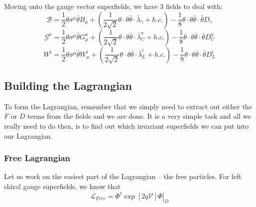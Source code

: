   Moving onto the gauge vector superfields, we have 3 fields to deal with:
  \begin{equation}
    \mathcal{B} = \frac{1}{2} \theta \sigma^\mu \bar{\theta} B_\mu + \left(\frac{1}{2\sqrt{2}} \theta\cdot\theta \bar{\theta}\cdot\bar{\lambda}_\gamma + h.c. \right) - \frac{1}{8}\theta\cdot\theta \bar{\theta}\cdot\bar{\theta} D_\gamma
  \end{equation}
  \begin{equation}
    \mathcal{G}^a = \frac{1}{2} \theta\sigma^\mu \bar{\theta} G^a_\mu + \left(\frac{1}{2\sqrt{2}} \theta\cdot\theta \bar{\theta}\cdot\bar{\lambda}^a_C + h.c.\right) - \frac{1}{8}\theta\cdot\theta\bar{\theta}\cdot\bar{\theta}D^a_C
  \end{equation}
  \begin{equation}
    W^i = \frac{1}{2} \theta\sigma^\mu \bar{\theta} W^i_\mu + \left(\frac{1}{2\sqrt{2}} \theta\cdot\theta\bar{\theta}\cdot\bar{\lambda}^i_L + h.c. \right) - \frac{1}{8} \theta\cdot\theta \bar{\theta}\cdot\bar{\theta} D^i_L
  \end{equation}

  \subsection{Building the Lagrangian}
  \label{ch:15:building the mssm:lagrangian}
  To form the Lagrangian, remember that we simply need to extract out either the $F$ or $D$ terms from the fields and we are done. It is a very simple task and all we really need to do then, is to find out which invariant superfields we can put into our Lagrangian.

  \subsubsection{Free Lagrangian}
  \label{ch:15:building the mssm:lagrangian:free}
    Let us work on the easiest part of the Lagrangian -- the free particles. For left chiral gauge superfields, we know that
    \begin{equation}
      \mathcal{L}_{Free} = \left.\Phi^\dagger \exp[2q\mathcal{V}] \Phi \right\vert_D
    \end{equation}

